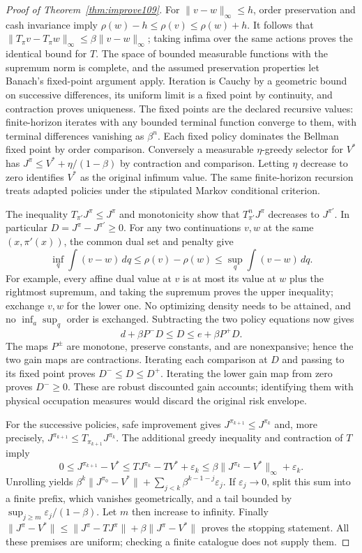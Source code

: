 \begin{proof}[Proof of Theorem~\ref{thm:improve109}]
For $\|v-w\|_\infty\le h$, order preservation and cash invariance imply
$\rho(w)-h\le\rho(v)\le\rho(w)+h$.
It follows that $\|T_\pi v-T_\pi w\|_\infty\le\beta\|v-w\|_\infty$; taking infima over the same actions proves the identical bound for $T$. The space of bounded measurable functions with the supremum norm is complete, and the assumed preservation properties let Banach's fixed-point argument apply. Iteration is Cauchy by a geometric bound on successive differences, its uniform limit is a fixed point by continuity, and contraction proves uniqueness. The fixed points are the declared recursive values: finite-horizon iterates with any bounded terminal function converge to them, with terminal differences vanishing as $\beta^n$. Each fixed policy dominates the Bellman fixed point by order comparison. Conversely a measurable $\eta$-greedy selector for $V^*$ has $J^\pi\le V^*+\eta/(1-\beta)$ by contraction and comparison. Letting $\eta$ decrease to zero identifies $V^*$ as the original infimum value. The same finite-horizon recursion treats adapted policies under the stipulated Markov conditional criterion.

The inequality $T_{\pi'}J^\pi\le J^\pi$ and monotonicity show that $T_{\pi'}^nJ^\pi$ decreases to $J^{\pi'}$. In particular $D=J^\pi-J^{\pi'}\ge0$. For any two continuations $v,w$ at the same $(x,\pi'(x))$, the common dual set and penalty give
\[
 \inf_q\int(v-w)\,dq\le\rho(v)-\rho(w)
       \le\sup_q\int(v-w)\,dq.
\]
For example, every affine dual value at $v$ is at most its value at $w$ plus the rightmost supremum, and taking the supremum proves the upper inequality; exchange $v,w$ for the lower one. No optimizing density needs to be attained, and no $\inf_a\sup_q$ order is exchanged. Subtracting the two policy equations now gives
\[
 d+\beta P^-D\le D\le e+\beta P^+D.
\]
The maps $P^\pm$ are monotone, preserve constants, and are nonexpansive; hence the two gain maps are contractions. Iterating each comparison at $D$ and passing to its fixed point proves $D^-\le D\le D^+$. Iterating the lower gain map from zero proves $D^-\ge0$. These are robust discounted gain accounts; identifying them with physical occupation measures would discard the original risk envelope.

For the successive policies, safe improvement gives $J^{\pi_{k+1}}\le J^{\pi_k}$ and, more precisely, $J^{\pi_{k+1}}\le T_{\pi_{k+1}}J^{\pi_k}$. The additional greedy inequality and contraction of $T$ imply
\[
 0\le J^{\pi_{k+1}}-V^*\le
 TJ^{\pi_k}-TV^*+\varepsilon_k
 \le\beta\|J^{\pi_k}-V^*\|_\infty+\varepsilon_k.
\]
Unrolling yields $\beta^k\|J^{\pi_0}-V^*\|+\sum_{j<k}\beta^{k-1-j}\varepsilon_j$. If $\varepsilon_j\to0$, split this sum into a finite prefix, which vanishes geometrically, and a tail bounded by $\sup_{j\ge m}\varepsilon_j/(1-\beta)$. Let $m$ then increase to infinity. Finally
$\|J^\pi-V^*\|\le\|J^\pi-TJ^\pi\|+\beta\|J^\pi-V^*\|$
proves the stopping statement. All these premises are uniform; checking a finite catalogue does not supply them.
\end{proof}

